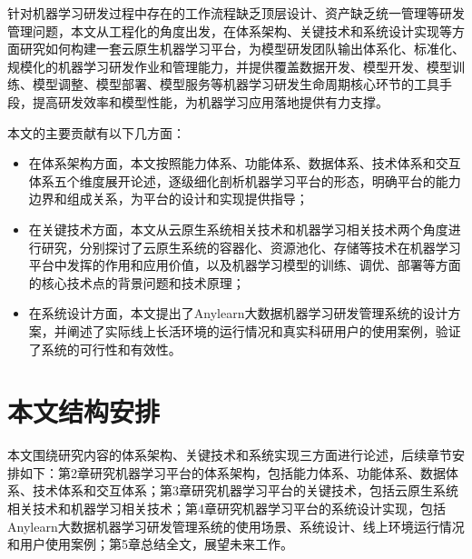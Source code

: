 针对机器学习研发过程中存在的工作流程缺乏顶层设计、资产缺乏统一管理等研发管理问题，本文从工程化的角度出发，在体系架构、关键技术和系统设计实现等方面研究如何构建一套云原生机器学习平台，为模型研发团队输出体系化、标准化、规模化的机器学习研发作业和管理能力，并提供覆盖数据开发、模型开发、模型训练、模型调整、模型部署、模型服务等机器学习研发生命周期核心环节的工具手段，提高研发效率和模型性能，为机器学习应用落地提供有力支撑。

本文的主要贡献有以下几方面：
\begin{itemize}
  \item 在体系架构方面，本文按照能力体系、功能体系、数据体系、技术体系和交互体系五个维度展开论述，逐级细化剖析机器学习平台的形态，明确平台的能力边界和组成关系，为平台的设计和实现提供指导；
  \item 在关键技术方面，本文从云原生系统相关技术和机器学习相关技术两个角度进行研究，分别探讨了云原生系统的容器化、资源池化、存储等技术在机器学习平台中发挥的作用和应用价值，以及机器学习模型的训练、调优、部署等方面的核心技术点的背景问题和技术原理；
  \item 在系统设计方面，本文提出了Anylearn大数据机器学习研发管理系统的设计方案，并阐述了实际线上长活环境的运行情况和真实科研用户的使用案例，验证了系统的可行性和有效性。
\end{itemize}


%
\section{本文结构安排}

本文围绕研究内容的体系架构、关键技术和系统实现三方面进行论述，后续章节安排如下：第2章研究机器学习平台的体系架构，包括能力体系、功能体系、数据体系、技术体系和交互体系；第3章研究机器学习平台的关键技术，包括云原生系统相关技术和机器学习相关技术；第4章研究机器学习平台的系统设计实现，包括Anylearn大数据机器学习研发管理系统的使用场景、系统设计、线上环境运行情况和用户使用案例；第5章总结全文，展望未来工作。  
